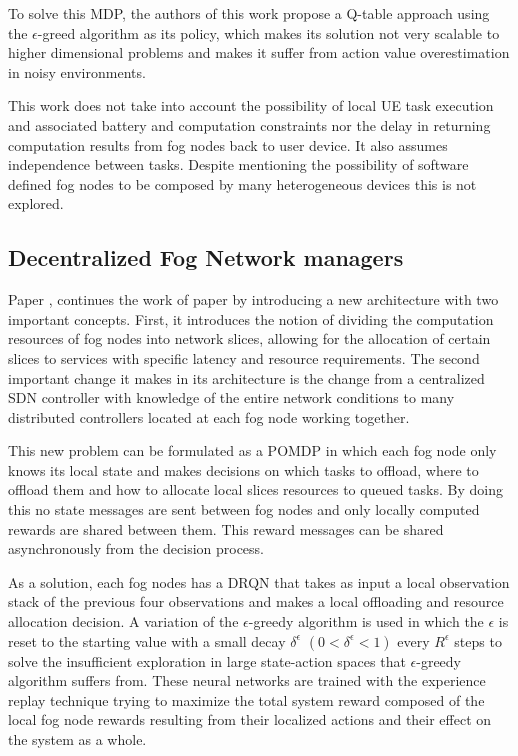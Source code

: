 To solve this \acrshort{MDP}, the authors of this work propose a Q-table approach using the $\epsilon$-greed algorithm as its policy, which makes its solution not very scalable to higher dimensional problems and makes it suffer from action value overestimation in noisy environments.

This work does not take into account the possibility of local \acrshort{UE} task execution and associated battery and computation constraints nor the delay in returning computation results from fog nodes back to user device.  It also assumes independence between tasks. Despite mentioning the possibility of software defined fog nodes to be composed by many heterogeneous devices this is not explored.


\subsection{Decentralized Fog Network managers}
\noindent Paper \cite{fogmulti}, continues the work of paper \cite{centralfog} by introducing a new architecture with two important concepts. First, it introduces the notion of dividing the computation resources of fog nodes into network slices, allowing for the allocation of certain slices to services with specific latency and resource requirements. The second important change it makes in its architecture is the change from a centralized \acrshort{SDN} controller with knowledge of the entire network conditions to many distributed controllers located at each fog node working together.

This new problem can be formulated as a \acrshort{POMDP} in which each fog node only knows its local state and makes decisions on which tasks to offload, where to offload them and how to allocate local slices resources to queued tasks. By doing this no state messages are sent between fog nodes and only locally computed rewards are shared between them. This reward messages can be shared asynchronously from the decision process.

As a solution, each fog nodes has a \acrfull{DRQN} that takes as input a local observation stack of the previous four observations and makes a local offloading and resource allocation decision. A variation of the $\epsilon$-greedy algorithm is used in which the $\epsilon$ is reset to the starting value with a small decay $\delta^\epsilon$ $(0<\delta^\epsilon < 1)$ every $R^\epsilon$ steps to solve the insufficient exploration in large state-action spaces that $\epsilon$-greedy algorithm suffers from. These neural networks are trained with the experience replay technique trying to maximize the total system reward composed of the local fog node rewards resulting from their localized actions and their effect on the system as a whole.

